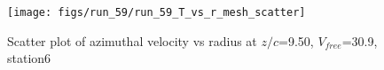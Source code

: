 \begin{figure}[H]
\centering
\texttt{[image: figs/run\_59/run\_59\_T\_vs\_r\_mesh\_scatter]}
\caption{Scatter plot of azimuthal velocity vs radius at $z/c$=9.50, $V_{free}$=30.9, station6}
\label{fig:run_59_T_vs_r_mesh_scatter}
\end{figure}


